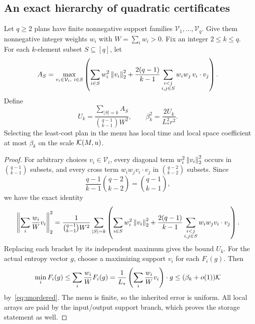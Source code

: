 \subsection{An exact hierarchy of quadratic certificates}

\begin{theorem}\label{thm:subset}
Let $q\ge2$ plans have finite nonnegative support families
$\mathcal V_1,\ldots,\mathcal V_q$. Give them nonnegative integer weights
$w_i$ with $W=\sum_iw_i>0$. Fix an integer $2\le k\le q$. For each
$k$-element subset $S\subseteq[q]$, let
\begin{equation}\label{eq:As}
 A_S=\max_{v_i\in\mathcal V_i,\ i\in S}
 \left(\sum_{i\in S}w_i^2\left\lVert v_i\right\rVert_2^2
       +\frac{2(q-1)}{k-1}
          \sum_{\substack{i<j\\i,j\in S}}w_iw_j\,v_i\cdot v_j\right).
\end{equation}
Define
\begin{equation}\label{eq:beta}
 U_k=\frac{\sum_{|S|=k}A_S}{\binom{q-1}{k-1}W^2},
 \qquad \beta_k^2=\frac{2U_k}{L_*^2r^2}.
\end{equation}
Selecting the least-cost plan in the menu has local time and local space
coefficient at most $\beta_k$ on the scale $\mathcal K(M,u)$.
\end{theorem}

\begin{proof}
For arbitrary choices $v_i\in\mathcal V_i$, every diagonal term
$w_i^2\left\lVert v_i\right\rVert_2^2$ occurs in $\binom{q-1}{k-1}$ subsets, and every
cross term $w_iw_jv_i\cdot v_j$ in $\binom{q-2}{k-2}$ subsets. Since
\[
 \frac{q-1}{k-1}\binom{q-2}{k-2}
 =\binom{q-1}{k-1},
\]
we have the exact identity
\begin{align*}
 \left\|\sum_i\frac{w_i}{W}v_i\right\|_2^2
 =\frac{1}{\binom{q-1}{k-1}W^2}
 \sum_{|S|=k}\left(
  \sum_{i\in S}w_i^2\left\lVert v_i\right\rVert_2^2
  +\frac{2(q-1)}{k-1}\sum_{\substack{i<j\\i,j\in S}}
       w_iw_jv_i\cdot v_j\right).
\end{align*}
Replacing each bracket by its independent maximum gives the bound $U_k$.
For the actual entropy vector $g$, choose a maximizing support $v_i$ for
each $F_i(g)$. Then
\[
 \min_i F_i(g)
 \le\sum_i\frac{w_i}{W}F_i(g)
 =\frac1{L_*}\left(\sum_i\frac{w_i}{W}v_i\right)\cdot g
 \le(\beta_k+o(1))\mathcal K
\]
by~\eqref{eq:unordered}. The menu is finite, so the inherited error is
uniform. All local arrays are paid by the input/output support branch,
which proves the storage statement as well.
\end{proof}

